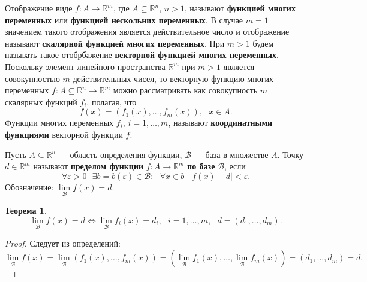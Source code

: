 \documentclass[12pt]{report}
\numberwithin{equation}{section}
\newtheorem{theorem}{Теорема}[section]
\begin{document}

Отображение виде $f : A \to \mathbb{R}^m$, где $A \subseteq \mathbb{R}^n$, $n > 1$, называют \textbf{функцией многих переменных} или \textbf{функцией нескольних переменных}. В случае $m = 1$ значением такого отображения является действительное число и отображение называют \textbf{скалярной функцией многих переменных}. При $m > 1$ будем называть такое отобрбажение \textbf{векторной функцией многих переменных}.\\

Поскольку элемент линейного пространства $\mathbb{R}^m$ при $m > 1$ является совокупностью $m$ действительных чисел, то векторную функцию многих переменных $f : A \subseteq \mathbb{R}^n \to \mathbb{R}^m$ можно рассматривать как совокупность $m$ скалярных функций $f_i$, полагая, что
\begin{equation} \label{eq:32:1}
f(x) = (f_1(x), \ldots, f_m(x)),~~~ x \in A.
\end{equation}
Функции многих переменных $f_i$, $i = 1, \ldots, m$, называют \textbf{координатными функциями} векторной функции $f$.

Пусть $A \subseteq \mathbb{R}^n$ --- область определения функции, $\mathcal{B}$ --- база в множестве $A$. Точку $d \in \mathbb{R}^m$ называют \textbf{пределом функции} $f : A \to \mathbb{R}^m$ \textbf{по базе} $\mathcal{B}$, если
\[ \forall \varepsilon > 0~~~\exists b = b(\varepsilon) \in \mathcal{B}:~~~ \forall x \in b ~~~ |f(x) - d| < \varepsilon. \]
Обозначение: $\lim\limits_{\mathcal{B}}f(x) = d$.

\begin{theorem} \label{th:32:1}
\[ \lim_{\mathcal{B}}f(x) = d \iff \lim_{\mathcal{B}}f_i(x) = d_i,~~~i = 1, \ldots, m, ~~~ d = (d_1, \ldots, d_m).\]
\end{theorem}
\begin{proof}
Следует из определений:
\[ \lim_{\mathcal{B}}f(x) = \lim_{\mathcal{B}}(f_1(x), \ldots, f_m(x)) = (\lim_{\mathcal{B}}f_1(x), \ldots, \lim_{\mathcal{B}}f_m(x)) = (d_1, \ldots, d_m) = d.\]
\end{proof}
\end{document}
